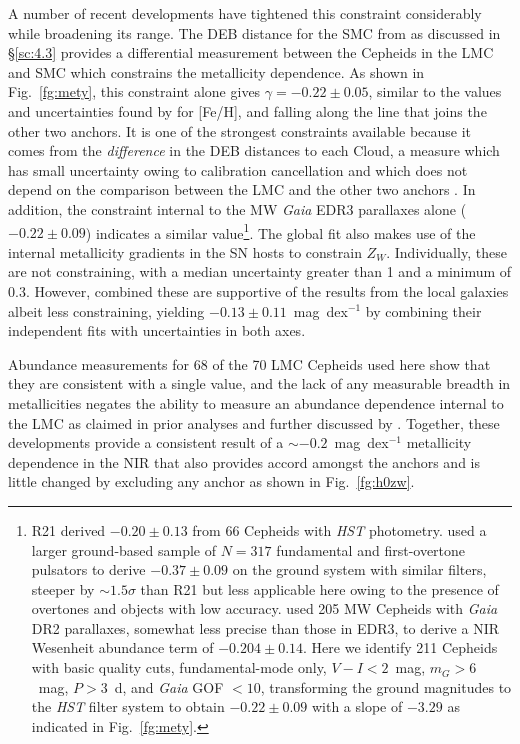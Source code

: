 \documentclass[12pt]{aastex631}
\begin{document}
A number of recent developments have tightened this constraint considerably while broadening its range.  The DEB distance for the SMC from \citet{Graczyk:2020} as discussed in \S\ref{sc:4.3} provides a differential measurement between the Cepheids in the LMC and SMC which constrains the metallicity dependence. As shown in Fig.~\ref{fg:mety}, this constraint alone gives $\gamma=-0.22\pm0.05$, similar to the values and uncertainties found by \citet{Breuval:2021} for [Fe/H], and falling along the line that joins the other two anchors.  It is one of the strongest constraints available because it comes from the {\it difference} in the DEB distances to each Cloud, a measure which has small uncertainty owing to calibration cancellation and which does not depend on the comparison between the LMC and the other two anchors  \citep{Graczyk:2020}. In addition, the constraint internal to the MW {\it Gaia} EDR3 parallaxes alone ($-0.22\pm0.09$) indicates a similar value\footnote{R21 derived $-0.20\pm0.13$ from 66 Cepheids with {\it HST} photometry.  \citet{Ripepi:2021} used a larger ground-based sample of $N=317$ fundamental and first-overtone pulsators to derive $-0.37\pm0.09$ on the ground system with similar filters, steeper by $\sim 1.5\sigma$ than R21 but less applicable here owing to the presence of overtones and objects with low accuracy. \citet{Groenwegen:2018} used 205 MW Cepheids with {\it Gaia} DR2 parallaxes, somewhat less precise than those in EDR3, to derive a NIR Wesenheit abundance term of $-0.204 \pm 0.14$.  Here we identify 211 Cepheids with basic quality cuts, fundamental-mode only, $V\!-\!I<2$~mag, $m_G>6$~mag, $P>3$~d, and {\it Gaia} GOF $<10$, transforming the ground magnitudes to the {\it HST} filter system to obtain $-0.22\pm0.09$ with a slope of $-3.29$ as indicated in Fig.~\ref{fg:mety}.}.  The global fit also makes use of the internal metallicity gradients in the SN hosts to constrain $Z_W$.  Individually, these are not constraining, with a median uncertainty greater than 1 and a minimum of 0.3. However, combined these are supportive of the results from the local galaxies albeit less constraining, yielding $-0.13 \pm 0.11$~mag~dex$^{-1}$ by combining their independent fits with uncertainties in both axes.  
   
Abundance measurements for 68 of the 70 LMC Cepheids used here \citep{Romaniello:2021} show that they are consistent with a single value, and the lack of any measurable breadth in metallicities negates the ability to measure an abundance dependence internal to the LMC as claimed in prior analyses \citep{Freedman:2011} and further discussed by \citet{Romaniello:2021}. Together, these developments provide a consistent result of a $\sim -0.2$~mag~dex$^{-1}$ metallicity dependence in the NIR that also provides accord amongst the anchors and is little changed by excluding any anchor as shown in Fig.~\ref{fg:h0zw}.
\end{document}
